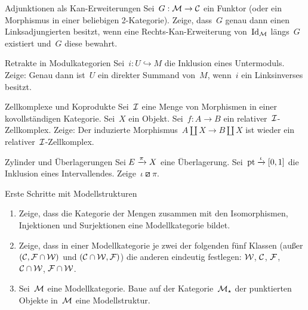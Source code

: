 \documentclass{uebblatt}
\begin{document}

\begin{aufgabe}{Adjunktionen als Kan-Erweiterungen}
Sei~$G : \mathcal{M} \to \mathcal{C}$ ein Funktor (oder ein Morphismus in einer beliebigen
2-Kategorie). Zeige, dass~$G$ genau dann einen Linksadjungierten besitzt, wenn
eine Rechts-Kan-Erweiterung von~$\mathrm{Id}_{\mathcal{M}}$ längs~$G$ existiert und~$G$ diese
bewahrt.
\end{aufgabe}

\begin{aufgabe}{Retrakte in Modulkategorien}
Sei~$i : U \hookrightarrow M$ die Inklusion eines Untermoduls. Zeige: Genau
dann ist~$U$ ein direkter Summand von~$M$, wenn~$i$ ein Linksinverses besitzt.
\end{aufgabe}

\begin{aufgabe}{Zellkomplexe und Koprodukte}
Sei~$\mathcal{I}$ eine Menge von Morphismen in einer kovollständigen Kategorie.
Sei~$X$ ein Objekt. Sei~$f : A \to B$ ein relativer~$\mathcal{I}$-Zellkomplex. Zeige: Der
induzierte Morphismus~$A \amalg X \to B \amalg X$ ist wieder ein
relativer~$\mathcal{I}$-Zellkomplex.
\end{aufgabe}

\begin{aufgabe}{Zylinder und Überlagerungen}
Sei $E \xrightarrow{\pi} X$ eine Überlagerung. Sei~$\mathrm{pt} \xrightarrow{\iota} [0,1]$ die
Inklusion eines Intervallendes. Zeige~$\iota \boxslash \pi$.
\end{aufgabe}
\vspace{-1em}

\begin{aufgabe}{Erste Schritte mit Modellstrukturen}
\begin{enumerate}
\item Zeige, dass die Kategorie der Mengen zusammen mit den Isomorphismen,
Injektionen und Surjektionen eine Modellkategorie bildet.
\item Zeige, dass in einer Modellkategorie je zwei der folgenden fünf Klassen
(außer $(\mathcal{C},\mathcal{F} \cap \mathcal{W})$ und $(\mathcal{C} \cap \mathcal{W},\mathcal{F})$) die anderen eindeutig
festlegen: $\mathcal{W}$, $\mathcal{C}$, $\mathcal{F}$, $\mathcal{C} \cap \mathcal{W}$, $\mathcal{F} \cap \mathcal{W}$.
\item Sei~$\mathcal{M}$ eine Modellkategorie. Baue auf der Kategorie~$\mathcal{M}_\star$ der
punktierten Objekte in~$\mathcal{M}$ eine Modellstruktur.
\end{enumerate}
\end{aufgabe}
\end{document}
